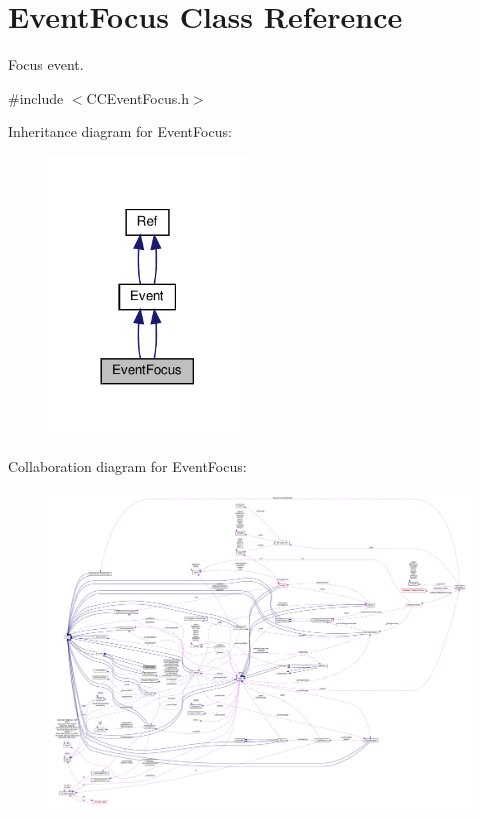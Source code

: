\hypertarget{classEventFocus}{}\section{Event\+Focus Class Reference}
\label{classEventFocus}


Focus event.  




{\ttfamily \#include $<$C\+C\+Event\+Focus.\+h$>$}



Inheritance diagram for Event\+Focus\+:
\nopagebreak
\begin{figure}[H]
\begin{center}
\leavevmode
\includegraphics[width=149pt]{classEventFocus__inherit__graph}
\end{center}
\end{figure}


Collaboration diagram for Event\+Focus\+:
\nopagebreak
\begin{figure}[H]
\begin{center}
\leavevmode
\includegraphics[width=350pt]{classEventFocus__coll__graph}
\end{center}
\end{figure}

